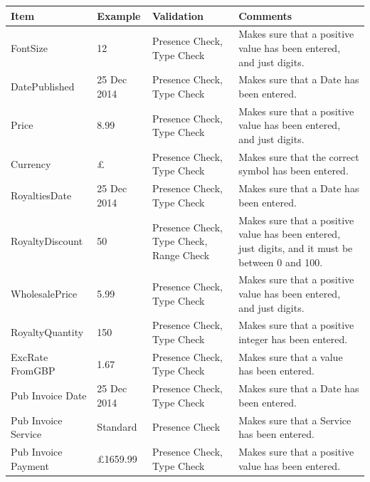 \begin{center}
    \begin{tabular}{|p{2.5cm}|p{2cm}|p{2cm}|p{3cm}|}
    \textbf{Item} & \textbf{Example} & \textbf{Validation} & \textbf{Comments}\\ \hline
    FontSize & 12 & Presence Check, Type Check & Makes sure that a positive value has been entered, and just digits. \\ \hline
    DatePublished & 25 Dec 2014 & Presence Check, Type Check & Makes sure that a Date has been entered. \\ \hline
    Price & 8.99 & Presence Check, Type Check & Makes sure that a positive value has been entered, and just digits. \\ \hline
    Currency & £ & Presence Check, Type Check & Makes sure that the correct symbol has been entered. \\ \hline
    RoyaltiesDate & 25 Dec 2014 & Presence Check, Type Check & Makes sure that a Date has been entered. \\ \hline
    RoyaltyDiscount & 50 & Presence Check, Type Check, Range Check & Makes sure that a positive value has been entered, just digits, and it must be between 0 and 100. \\ \hline
    WholesalePrice & 5.99 & Presence Check, Type Check & Makes sure that a positive value has been entered, and just digits. \\ \hline
    RoyaltyQuantity & 150 & Presence Check, Type Check & Makes sure that a positive integer has been entered. \\ \hline
    ExcRate FromGBP & 1.67 & Presence Check, Type Check & Makes sure that a value has been entered. \\ \hline
    Pub Invoice Date & 25 Dec 2014 & Presence Check, Type Check & Makes sure that a Date has been entered. \\ \hline
    Pub Invoice Service & Standard & Presence Check & Makes sure that a Service has been entered. \\ \hline
    Pub Invoice Payment & £1659.99 & Presence Check, Type Check & Makes sure that a positive value has been entered. \\ \hline
\end{tabular}
\end{center}

